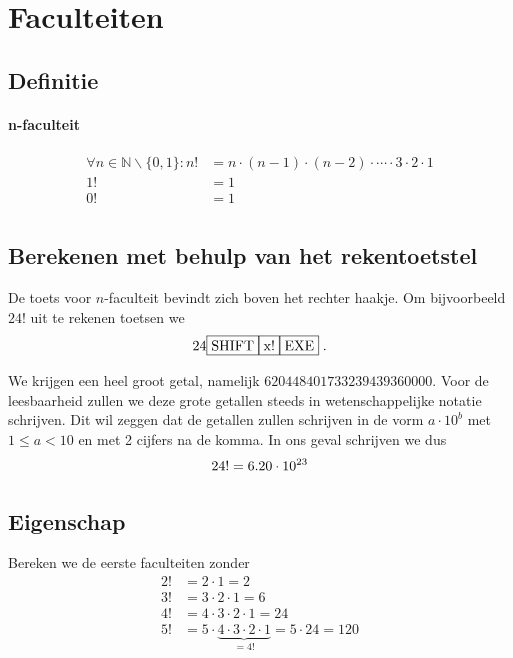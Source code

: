 \documentclass[12pt,a4paper,twoside]{article}
\begin{document}
\pagebreak
\section{Faculteiten}

\subsection{Definitie}

\paragraph*{n-faculteit}
\begin{mdframed}
\begin{align*}
\forall n \in \mathbb{N}\backslash\{0,1\}: n!&=n\cdot(n-1)\cdot(n-2)\cdot \cdots \cdot 3\cdot2\cdot1\\
                           1!&=1\\
                           0!&=1\\
\end{align*}
\end{mdframed}

\subsection{Berekenen met behulp van het rekentoetstel}

De toets voor $n$-faculteit bevindt zich boven het rechter haakje. Om bijvoorbeeld $24!$ uit te rekenen toetsen we
$$24 \zrm{SHIFT} \zrm{x!} \zrm{EXE}\;.$$

We krijgen een heel groot getal, namelijk $620448401733239439360000$. Voor de leesbaarheid zullen we deze grote getallen steeds in wetenschappelijke notatie schrijven. Dit wil zeggen dat de getallen zullen schrijven in de vorm $a \cdot 10^b$ met $1 \leq a < 10$ en met 2 cijfers na de komma. In ons geval schrijven we dus
\[24! = 6.20\cdot 10^{23}\]

\subsection{Eigenschap}

Bereken we de eerste faculteiten zonder 
\begin{align*}
  2! &= 2 \cdot 1 = 2\\
  3! &= 3 \cdot 2 \cdot 1 = 6\\
  4! &= 4 \cdot 3 \cdot 2 \cdot 1 = 24\\
  5! &= 5 \cdot \underbrace{4 \cdot 3 \cdot 2 \cdot 1}_{=4!} = 5 \cdot 24 = 120
\end{align*}
\end{document}
